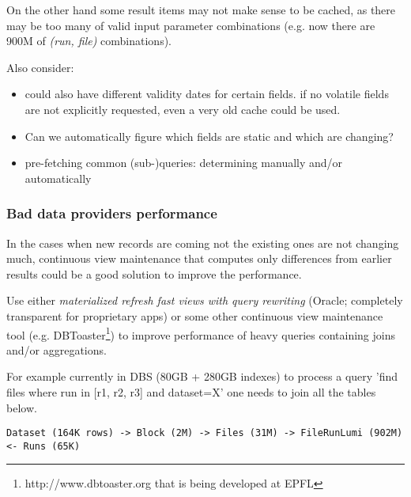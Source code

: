On the other hand some result items may not make sense to be cached, as there may be too many of valid input parameter combinations (e.g. now there are 900M of \textit{(run, file)} combinations).

Also consider:
                			\begin{itemize}
                			\item could also have different validity dates for certain fields. if no volatile fields are not explicitly requested, even a very old cache could be used. 
                			\item Can we automatically figure which fields are static and which are changing?
                			\item pre-fetching common (sub-)queries: determining manually and/or automatically
                			\end{itemize}





\subsubsection*{Bad data providers performance}
In the cases when new records are coming not the existing ones are not changing much, continuous view maintenance that computes only differences from earlier results could be a good solution to improve the performance. 


Use either \textit{materialized refresh fast views with query rewriting} (Oracle; completely transparent for proprietary apps)\cite{Oracle11}
 or some other continuous view maintenance tool (e.g. DBToaster\footnote{http://www.dbtoaster.org that is being developed at EPFL}) to improve performance of heavy queries containing joins and/or aggregations.

For example currently in DBS (80GB + 280GB indexes) to process a query 'find files where run in [r1, r2, r3] and dataset=X' one needs to join all the tables below.

\begin{verbatim}
Dataset (164K rows) -> Block (2M) -> Files (31M) -> FileRunLumi (902M) <- Runs (65K)
\end{verbatim}

